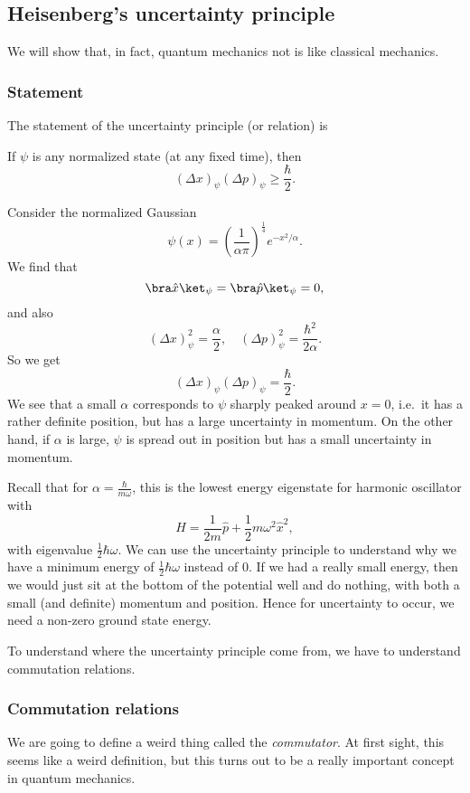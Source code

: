 \documentclass[a4paper]{article}
\begin{document}
\subsection{Heisenberg's uncertainty principle}
We will show that, in fact, quantum mechanics not is like classical mechanics.

\subsubsection*{Statement}
The statement of the uncertainty principle (or relation) is
\begin{thm}
  If $\psi$ is any normalized state (at any fixed time), then
  \[
    (\Delta x)_\psi (\Delta p)_\psi \geq \frac{\hbar}{2}.
  \]
\end{thm}

\begin{eg}
  Consider the normalized Gaussian
  \[
    \psi(x) = \left(\frac{1}{\alpha \pi}\right)^{\frac{1}{4}} e^{-x^2/\alpha}.
  \]
  We find that
  \[
    \bra \hat{x}\ket_\psi = \bra \hat{p}\ket_\psi = 0,
  \]
  and also
  \[
    (\Delta x)_\psi^2 = \frac{\alpha}{2},\quad (\Delta p)_\psi^2 = \frac{\hbar^2}{2\alpha}.
  \]
  So we get
  \[
    (\Delta x)_\psi(\Delta p)_\psi = \frac{\hbar}{2}.
  \]
  We see that a small $\alpha$ corresponds to $\psi$ sharply peaked around $x = 0$, i.e.\ it has a rather definite position, but has a large uncertainty in momentum. On the other hand, if $\alpha$ is large, $\psi$ is spread out in position but has a small uncertainty in momentum.
\end{eg}
Recall that for $\alpha = \frac{\hbar}{m\omega}$, this is the lowest energy eigenstate for harmonic oscillator with
\[
  H = \frac{1}{2m}\hat{p} + \frac{1}{2}m\omega^2 \hat{x}^2,
\]
with eigenvalue $\frac{1}{2}\hbar \omega$. We can use the uncertainty principle to understand why we have a minimum energy of $\frac{1}{2}\hbar \omega$ instead of $0$. If we had a really small energy, then we would just sit at the bottom of the potential well and do nothing, with both a small (and definite) momentum and position. Hence for uncertainty to occur, we need a non-zero ground state energy.

To understand where the uncertainty principle come from, we have to understand commutation relations.
\subsubsection*{Commutation relations}
We are going to define a weird thing called the \emph{commutator}. At first sight, this seems like a weird definition, but this turns out to be a really important concept in quantum mechanics.
\end{document}

